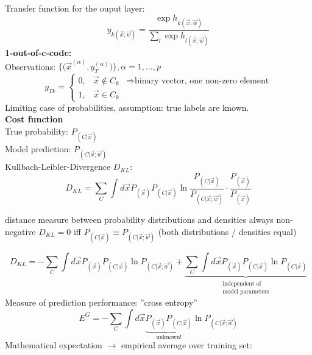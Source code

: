 Transfer function for the ouput layer:
\begin{equation} \tag{softmax function}
	y_{k (\vec{x};\vec{w})} = \frac{\exp h_{k (\vec{x};\vec{w})}}{
		\sum_l \exp h_{l (\vec{x};\vec{w})}}
\end{equation}
{\bf 1-out-of-c-code:}
\\
Observations: $\Big\{ \Big( \vec{x}^{(\alpha)}, y_T^{(\alpha)} \Big) \Big\}, \alpha = 1, \ldots, p$\\
\begin{equation}
	y_{Tk} = \left 
	\{ \begin{array}{lll}
	0, & \vec{x} \notin C_k & \Rightarrow \text{binary vector, one non-zero
		element} \\
	1, & \vec{x} \in C_k
	\end{array} \right.
\end{equation}
Limiting case of probabilities, assumption: true labels are known.
\\
{\bf Cost function}
\\
True probability: $P_{(C|\vec{x})}$ \\
Model prediction: $P_{(C|\vec{x};\vec{w})}$
\\
Kullbach-Leibler-Divergence $D_{KL}$:
\begin{equation}
	D_{KL} = \sum_C \int d \vec{x} P_{(\vec{x})} P_{(C|\vec{x})} 
		\ln \frac{P_{(C|\vec{x})}}{P_{(C|\vec{x};\vec{w})}}
		\cdot \frac{P_{(\vec{x})}}{P_{(\vec{x})}}
\end{equation}
\begin{itemize}
	\itR distance measure between probability distributions and densities
	\itR always non-negative
	\itR $D_{KL} = 0$ iff $P_{(C|\vec{x})} \equiv P_{(C|\vec{x};\vec{w})}$ 
		(both distributions / densities equal)
\end{itemize}
\begin{equation}
	D_{KL} = -\sum_C \int d \vec{x} P_{(\vec{x})} P_{(C|\vec{x})} \ln
		P_{(C|\vec{x};\vec{w})} + 
		\underbrace{ \sum_C \int d \vec{x} P_{(\vec{x})} 
			P_{(C|\vec{x})} \ln P_{(C|\vec{x})} }_{
				\substack{\text{independent of} \\
					\text{model parameters}
				}}
\end{equation}
Measure of prediction performance: ''cross entropy''
\begin{equation}
	E^G = -\sum_C \int d \vec{x} 
		\underbrace{P_{(\vec{x})} P_{(C|\vec{x})}}_{\text{unknown!}}
		\ln P_{(C|\vec{x};\vec{w})}
\end{equation}
Mathematical expectation $\rightarrow$ empirical average over training set:
